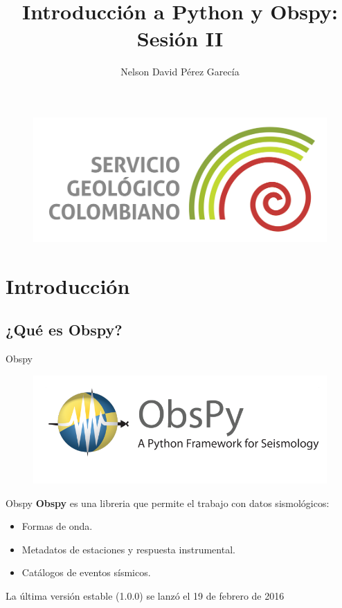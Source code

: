 \documentclass[11pt]{beamer}
\author{Nelson David Pérez Garecía\\}
\title{Introducción a Python y Obspy:\\Sesión II}
\institute{Servicio Geológico Colombiano}
\date{}
\begin{document}
\begin{frame}
\titlepage
\begin{center}
\begin{figure}
\includegraphics[scale=0.15]{Logo-SGC.jpg}
\end{figure}
\end{center}
\end{frame}

\begin{frame}
\tableofcontents
\end{frame}

\section{Introducción}
\subsection{¿Qué es Obspy?}
\begin{frame}{Obspy}
\begin{center}
\begin{figure}
\includegraphics[scale=0.3]{obspy-logo.png}
\end{figure}
\end{center}
\end{frame}


\begin{frame}{Obspy}
\textbf{Obspy} es una libreria que permite el trabajo con datos sismológicos:
\pause
\begin{itemize}
\item Formas de onda.\\
\item Metadatos de estaciones y respuesta instrumental.\\
\item Catálogos de eventos sísmicos.\\
\end{itemize}
La última versión estable (1.0.0) se lanzó el 19 de febrero de 2016
\end{frame}
\end{document}
